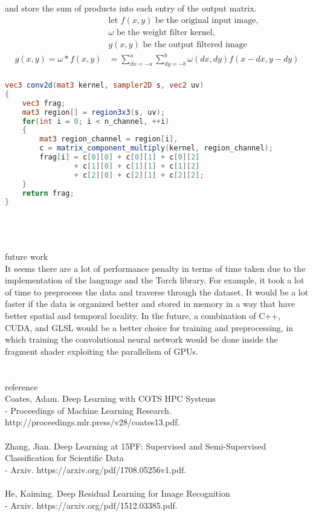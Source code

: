 \documentclass[12pt, border = 4pt, multi]{article} %
\begin{document}
and store the sum of products into each entry of the output matrix.
\begin{align*}
&\text{let } f(x, y) \text{ be the original input image},\\
&\omega \text{ be the weight filter kernel},\\
&g(x, y) \text{ be the output filtered image}\\
g(x, y) = \omega * f(x, y) &= \sum_{dx = -a} ^ a \sum_{dy = -b} ^ b \omega (dx, dy) f(x -dx, y - dy)\\
\end{align*}
\begin{lstlisting}[language = glsl]
vec3 conv2d(mat3 kernel, sampler2D s, vec2 uv)
{
    vec3 frag;
    mat3 region[] = region3x3(s, uv);
    for(int i = 0; i < n_channel, ++i)
    {
        mat3 region_channel = region[i],
        c = matrix_component_multiply(kernel, region_channel);
        frag[i] = c[0][0] + c[0][1] + c[0][2]
                + c[1][0] + c[1][1] + c[1][2]
                + c[2][0] + c[2][1] + c[2][2];
    }
    return frag;
}
\end{lstlisting}
\leavevmode
\noindent
\\
\\
\\
future work\\
It seems there are a lot of performance penalty in terms of time taken due to the implementation of the language and the Torch library. For example, it took a lot of time to preprocess the data and traverse through the dataset. It would be a lot faster if the data is organized better and stored in memory in a way that have better spatial and temporal locality. In the future, a combination of C++, CUDA, and GLSL would be a better choice for training and preprocessing, in which training the convolutional neural network would be done inside the fragment shader exploiting the parallelism of GPUs.
\\
\\
\\
reference\\
Coates, Adam. Deep Learning with COTS HPC Systems\\
- Proceedings of Machine Learning Research. http://proceedings.mlr.press/v28/coates13.pdf.\\
\\
Zhang, Jian. Deep Learning at 15PF: Supervised and Semi-Supervised Classification for Scientific Data\\
- Arxiv. https://arxiv.org/pdf/1708.05256v1.pdf.\\
\\
He, Kaiming. Deep Residual Learning for Image Recognition\\
- Arxiv. https://arxiv.org/pdf/1512.03385.pdf.\\
\\
\end{document}
